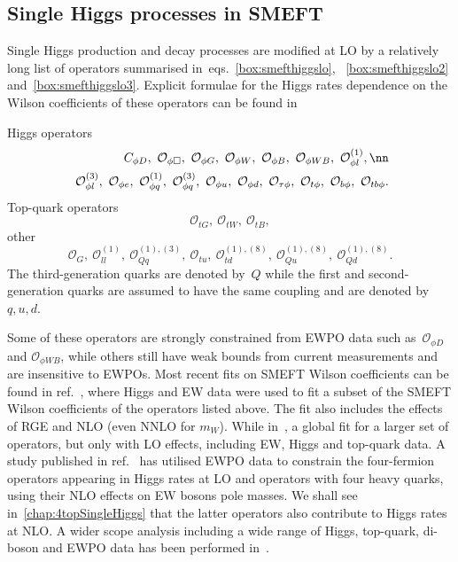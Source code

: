 \subsection{Single Higgs processes in SMEFT}
Single Higgs production and decay processes are modified at LO by a relatively long list of operators summarised in~eqs.~\eqref{box:smefthiggslo}, ~\eqref{box:smefthiggslo2} and~\eqref{box:smefthiggslo3}. Explicit formulae for the Higgs rates dependence on the Wilson coefficients of these operators can be found in~\cite{ATLAS:2019dhi}
\begin{tcolorbox}[title=SMEFT operators modifying Higgs rates at LO,
	title filled=false,
	colback=Mahogany!5!white,
	colframe=Mahogany ]
	Higgs operators
	\begin{align}
		C_{\phi D}, \ \mathcal{O}_{\phi \Box},\ \mathcal{O}_{\phi G}, \ \mathcal{O}_{\phi W},\ \mathcal{O}_{\phi B}, \ \mathcal{O}_{\phi W B},\ \mathcal{O}_{\phi l}^{(1)}, \nn \\
		\ \mathcal{O}_{\phi l}^{(3)}, \ \mathcal{O}_{\phi e},\ \mathcal{O}_{\phi q}^{(1)},\ \mathcal{O}_{\phi q}^{(3)}, \  \mathcal{O}_{\phi u}, \ \mathcal{O}_{\phi d},\ \mathcal{O}_{\tau \phi}, \ \mathcal{O}_{t \phi}, \ \mathcal{O}_{b \phi},\ \mathcal{O}_{tb \phi}.
		\label{box:smefthiggslo}
	\end{align}
	Top-quark operators
	\begin{equation}
		\mathcal{O}_{t G}, \ \mathcal{O}_{t W}, \ \mathcal{O}_{t B},
		\label{box:smefthiggslo2}
	\end{equation}
	other 
	\begin{equation}
		\mathcal{O}_G,\ \mathcal{O}_{ll}^{(1)},\ \mathcal{O}_{Qq}^{(1),(3)},\ \mathcal{O}_{tu},\ \mathcal{O}_{td}^{(1),(8)},\ \mathcal{O}_{Qu}^{(1),(8)}, \ \mathcal{O}_{Qd}^{(1),(8)}.
		\label{box:smefthiggslo3}
	\end{equation}
	The third-generation quarks are denoted by~$Q$ while the first and second-generation quarks are assumed to have the same coupling and are denoted by $q,u,d$.
\end{tcolorbox}
Some of these operators are strongly constrained from EWPO data such as~$\mathcal{O}_{\phi D}$ and $ \mathcal{O}_{\phi W B}$, while others still have weak bounds from current measurements and are insensitive to EWPOs. Most recent fits on SMEFT Wilson coefficients can be found in ref.~\cite{Dawson:2020oco}, where Higgs and EW data were used to fit a subset of the SMEFT Wilson coefficients of the operators listed above. The fit also includes the effects of RGE and NLO (even NNLO for $m_W$). While in~\cite{Ethier:2021bye}, a global fit for a larger set of operators, but only with LO effects, including EW, Higgs and top-quark data.  A study published in ref.~\cite{Dawson:2022bxd} has utilised EWPO data to constrain the four-fermion operators appearing in Higgs rates at LO and operators with four heavy quarks, using their NLO effects on EW bosons pole masses. We shall see in~\autoref{chap:4topSingleHiggs} that the latter operators also contribute to Higgs rates at NLO. A wider scope analysis including a wide range of Higgs, top-quark, di-boson and EWPO data has been performed in~\cite{Ellis:2020unq}. \\
